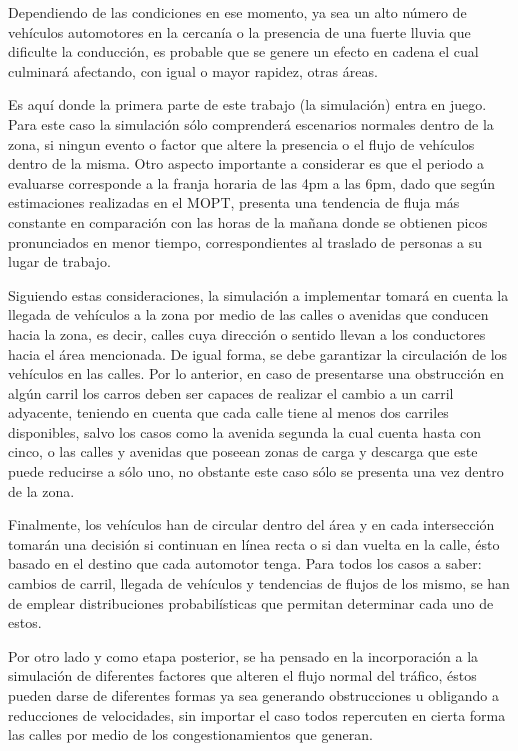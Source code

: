 \documentclass[12pt,journal,compsoc]{IEEEtran}
\begin{document}
	Dependiendo de las condiciones en ese momento, ya sea un alto n\'{u}mero de
	veh\'{i}culos automotores en la cercan\'{i}a o la presencia de una fuerte lluvia que
	dificulte la conducci\'{o}n, es probable que se genere un efecto en cadena el cual
	culminar\'{a} afectando, con igual o mayor rapidez, otras \'{a}reas.

	Es aqu\'{i} donde la primera parte de este trabajo (la simulaci\'{o}n) entra en juego. Para este caso la simulaci\'{o}n s\'{o}lo comprender\'{a} escenarios normales dentro de la zona, si ningun evento o factor que altere la presencia o el flujo de veh\'{i}culos dentro de la misma. Otro aspecto importante a considerar es que el periodo a evaluarse corresponde a la franja horaria de las 4pm a las 6pm, dado que seg\'{u}n estimaciones realizadas en el MOPT, presenta una tendencia de fluja m\'{a}s constante en comparaci\'{o}n con las horas de la ma\~{n}ana donde se obtienen picos pronunciados en menor tiempo, correspondientes al traslado de personas a su lugar de trabajo.
	
	Siguiendo estas consideraciones, la simulaci\'{o}n a implementar tomar\'{a} en cuenta la llegada de veh\'{i}culos a la zona por medio de las calles o avenidas que conducen hacia la zona, es decir, calles cuya direcci\'{o}n o sentido llevan a los conductores hacia el \'{a}rea mencionada. De igual forma, se debe garantizar la circulaci\'{o}n de los veh\'{i}culos en las calles. Por lo anterior, en caso de presentarse una obstrucci\'{o}n en alg\'{u}n carril los carros deben ser capaces de realizar el cambio a un carril adyacente, teniendo en cuenta que cada calle tiene al menos dos carriles disponibles, salvo los casos como la avenida segunda la cual cuenta hasta con cinco, o las calles y avenidas que poseean zonas de carga y descarga que este puede reducirse a s\'{o}lo uno, no obstante este caso s\'{o}lo se presenta una vez dentro de la zona.

	Finalmente, los veh\'{i}culos han de circular dentro del \'{a}rea y en cada intersecci\'{o}n tomar\'{a}n una decisi\'{o}n si continuan en l\'{i}nea recta o si dan vuelta en la calle, \'{e}sto basado en el destino que cada automotor tenga. Para todos los casos a saber: cambios de carril, llegada de veh\'{i}culos y tendencias de flujos de los mismo, se han de emplear distribuciones probabil\'{i}sticas que permitan determinar cada uno de estos.
	
	Por otro lado y como etapa posterior, se ha pensado en la incorporaci\'{o}n a la simulaci\'{o}n de diferentes factores que alteren el flujo normal del tr\'{a}fico, \'{e}stos pueden darse de diferentes formas ya sea generando obstrucciones u obligando a reducciones de velocidades, sin importar el caso todos repercuten en cierta forma las calles por medio de los congestionamientos que generan.
	
\end{document}
